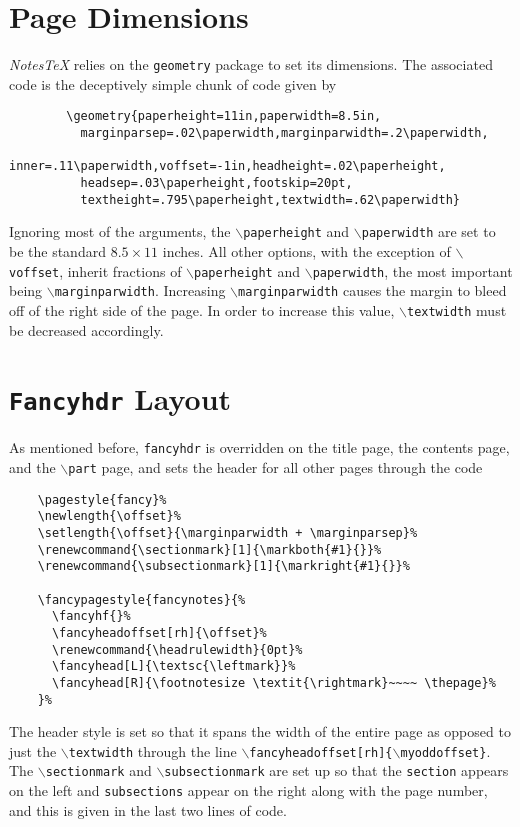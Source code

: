 \documentclass[10pt]{article}
\begin{document}
	\section{Page Dimensions}
	\textit{NotesTeX} relies on the \texttt{geometry} package to set its dimensions. The associated code is the deceptively simple chunk of code given by
	\begin{verbatim}
		\geometry{paperheight=11in,paperwidth=8.5in,
          marginparsep=.02\paperwidth,marginparwidth=.2\paperwidth,
          inner=.11\paperwidth,voffset=-1in,headheight=.02\paperheight,
          headsep=.03\paperheight,footskip=20pt,
          textheight=.795\paperheight,textwidth=.62\paperwidth}
	\end{verbatim}
	Ignoring most of the arguments, the \texttt{$\backslash$paperheight} and \texttt{$\backslash$paperwidth} are set to be the standard $8.5\times11$ inches. All other options, with the exception of \texttt{$\backslash$voffset}, inherit fractions of \texttt{$\backslash$paperheight} and \texttt{$\backslash$paperwidth}, the most important being \texttt{$\backslash$marginparwidth}. Increasing \texttt{$\backslash$marginparwidth} causes the margin to bleed off of the right side of the page. In order to increase this value, \texttt{$\backslash$textwidth} must be decreased accordingly.


	\section{\texttt{Fancyhdr} Layout}
	As mentioned before, \texttt{fancyhdr} is overridden on the title page, the contents page, and the \texttt{$\backslash$part} page, and sets the header for all other pages through the code
	\begin{verbatim}
	\pagestyle{fancy}%
	\newlength{\offset}%
	\setlength{\offset}{\marginparwidth + \marginparsep}%
	\renewcommand{\sectionmark}[1]{\markboth{#1}{}}%
	\renewcommand{\subsectionmark}[1]{\markright{#1}{}}%

	\fancypagestyle{fancynotes}{%
	  \fancyhf{}%
	  \fancyheadoffset[rh]{\offset}%
	  \renewcommand{\headrulewidth}{0pt}%
	  \fancyhead[L]{\textsc{\leftmark}}%
	  \fancyhead[R]{\footnotesize \textit{\rightmark}~~~~ \thepage}%
	}%
	\end{verbatim}
	The header style is set so that it spans the width of the entire page as opposed to just the \texttt{$\backslash$textwidth} through the line \texttt{$\backslash$fancyheadoffset[rh]\{$\backslash$myoddoffset\}}. The \texttt{$\backslash$sectionmark} and \texttt{$\backslash$subsectionmark} are set up so that the \texttt{section} appears on the left and \texttt{subsections} appear on the right along with the page number, and this is given in the last two lines of code.
\end{document}
